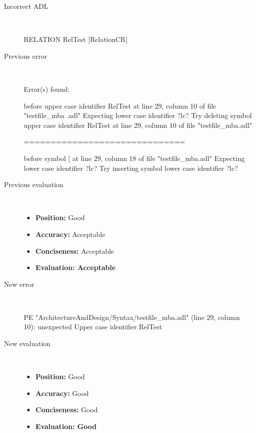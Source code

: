 \begin{description}
  \item[Incorrect ADL]~\\
\begin{adl}
RELATION RelTest [RelationCR]\end{adl}
  \item[Previous error]~\\
\begin{haskell}
Error(s) found:

before upper case identifier RelTest at line 29, column 10 of file "testfile_mba
.adl"
Expecting lower case identifier ?lc?
Try deleting symbol upper case identifier RelTest at line 29, column 10 of file
"testfile_mba.adl"

==============================

before symbol [ at line 29, column 18 of file "testfile_mba.adl"
Expecting lower case identifier ?lc?
Try inserting symbol lower case identifier ?lc?\end{haskell}
  \item[Previous evaluation]~\\
    \begin{itemize}
    \item \textbf{Position:} Good
    \item \textbf{Accuracy:} Acceptable
    \item \textbf{Conciseness:} Acceptable
    \item \textbf{Evaluation: Acceptable}
    \end{itemize}
  \item[New error]~\\
\begin{haskell}
PE "ArchitectureAndDesign/Syntax/testfile_mba.adl" (line 29, column 10):
unexpected Upper case identifier RelTest\end{haskell}
  \item[New evaluation]~\\
    \begin{itemize}
    \item \textbf{Position:} Good
    \item \textbf{Accuracy:} Good
    \item \textbf{Conciseness:} Good
    \item \textbf{Evaluation: Good}
    \end{itemize}
  \end{description}

\hrulefill

